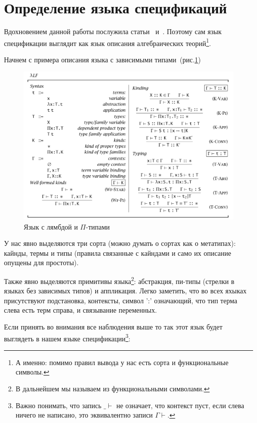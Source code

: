 \section{Определение языка спецификаций}\label{lang_spec}

Вдохновением данной работы послужила статьи~\cite{Palmgren} и~\cite{isaev}. Поэтому сам язык спецификации выглядит как язык описания алгебраических теорий\footnote{А именно: помимо правил вывода у нас есть сорта и функциональные символы.}.

Начнем с примера описания языка с зависимыми типами~(рис.\ref{lpi})~\cite[Глава~2.1]{book:pierce}

\begin{figure}
    \centering
	\includegraphics[scale=0.35]{img/lp.png}
	\caption{Язык с лямбдой и $\Pi$-типами }
	\label{lpi}
\end{figure}

У нас явно выделяются три сорта (можно думать о сортах как о метатипах): кайнды, термы и типы (правила связанные с кайндами и само их описание опущены для простоты).

Также явно выделяются примитивы языка\footnote{В дальнейшем мы называем из функциональными символами.}:
абстракция, пи-типы (стрелки в языках без зависимых типов) и аппликация. Легко заметить, что во всех яхыках присутствуют подстановка, контексты, символ ':' означающий, что тип терма слева есть терм справа, и связывание переменных.

Если принять во внимания все наблюдения выше то так этот язык будет выглядеть в нашем языке спецификации\footnote{Важно понимать, что запись $\_ \vdash$ не означает, что контекст пуст, если слева ничего не написано, это эквивалентно записи $\Gamma \vdash$.}:

